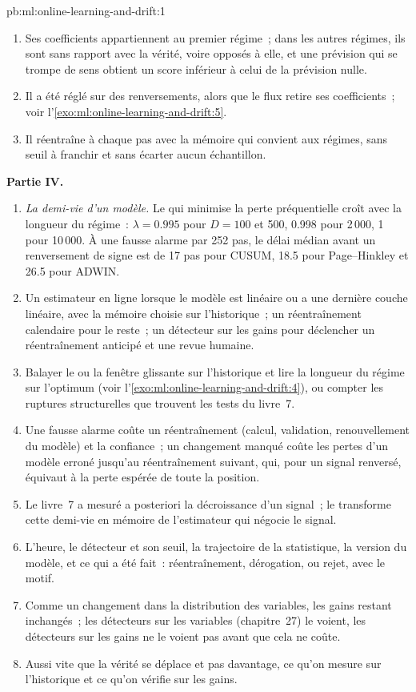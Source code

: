 \begin{solution}{pb:ml:online-learning-and-drift:1}
\begin{enumerate}[resume]
3.24~\%~; la valeur vraie 4.62~\%.
\item Ses coefficients appartiennent au premier régime~; dans les autres régimes, ils sont sans rapport avec la vérité, voire opposés à elle, et une
prévision qui se trompe de sens obtient un score inférieur à celui de la prévision nulle.
\item Il a été réglé sur des renversements, alors que le flux retire ses coefficients~; voir l'\cref{exo:ml:online-learning-and-drift:5}.
\item Il réentraîne à chaque pas avec la mémoire qui convient aux régimes, sans seuil à franchir et sans écarter aucun échantillon.
\end{enumerate}
\textbf{Partie IV.}
\begin{enumerate}[resume]
\item \emph{La demi-vie d'un modèle.} Le  qui minimise la perte préquentielle croît avec la
longueur du régime~: $\lambda = 0.995$ pour $D = 100$ et 500, 0.998 pour 2\,000, 1 pour 10\,000. À une fausse alarme par 252 pas, le
délai médian avant un renversement de signe est de 17 pas pour CUSUM, 18.5 pour Page--Hinkley et 26.5 pour ADWIN.
\item Un estimateur en ligne lorsque le modèle est linéaire ou a une dernière couche linéaire, avec la mémoire choisie sur l'historique~; un
réentraînement calendaire pour le reste~; un détecteur sur les gains pour déclencher un réentraînement anticipé et une revue humaine.
\item Balayer le  ou la fenêtre glissante sur l'historique et lire la longueur du régime sur l'optimum
(voir l'\cref{exo:ml:online-learning-and-drift:4}), ou compter les ruptures structurelles que trouvent les tests du livre~7.
\item Une fausse alarme coûte un réentraînement (calcul, validation, renouvellement du modèle) et la confiance~; un changement manqué coûte les
pertes d'un modèle erroné jusqu'au réentraînement suivant, qui, pour un signal renversé, équivaut à la perte espérée de toute la position.
\item Le livre~7 a mesuré a posteriori la décroissance d'un signal~; le  transforme cette demi-vie
en mémoire de l'estimateur qui négocie le signal.
\item L'heure, le détecteur et son seuil, la trajectoire de la statistique, la version du modèle, et ce qui a été fait~: réentraînement,
dérogation, ou rejet, avec le motif.
\item Comme un changement dans la distribution des variables, les gains restant inchangés~; les détecteurs sur les variables (chapitre~27) le voient,
les détecteurs sur les gains ne le voient pas avant que cela ne coûte.
\item Aussi vite que la vérité se déplace et pas davantage, ce qu'on mesure sur l'historique et ce qu'on vérifie sur les gains.
\end{enumerate}
\end{solution}

